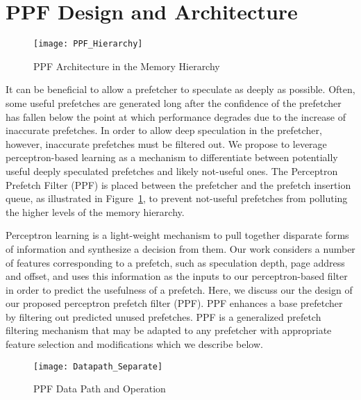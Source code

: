 \section{PPF Design and Architecture}
\label{Arch}

\begin{figure}
  \begin{center}
  \texttt{[image: PPF\_Hierarchy]}
  \caption{PPF Architecture in the Memory Hierarchy}
  \label{fig:PPF_Hierarchy}
  \end{center}
\end{figure}

It can be beneficial to allow a prefetcher to speculate as deeply as
possible. Often, some useful prefetches are generated long after the
confidence of the prefetcher has fallen below the point at which
performance degrades due to the increase of inaccurate prefetches.  In
order to allow deep speculation in the prefetcher, however, inaccurate
prefetches must be filtered out.  We propose to leverage
perceptron-based learning as a mechanism to differentiate between
potentially useful deeply speculated prefetches and likely not-useful
ones. The Perceptron Prefetch Filter (PPF) is placed between the
prefetcher and the prefetch insertion queue, as illustrated in
Figure~\ref{fig:PPF_Hierarchy}, to prevent not-useful prefetches from
polluting the higher levels of the memory hierarchy.

Perceptron learning is a light-weight mechanism to pull together
disparate forms of information and synthesize a decision from
them. Our work considers a number of features corresponding to a
prefetch, such as speculation depth, page address and offset, and uses
this information as the inputs to our perceptron-based filter in order
to predict the usefulness of a prefetch.  Here, we discuss our the
design of our proposed perceptron prefetch filter (PPF).  PPF enhances
a base prefetcher by filtering out predicted unused prefetches. PPF is
a generalized prefetch filtering mechanism that may be adapted to any
prefetcher with appropriate feature selection and modifications which
we describe below.

\begin{figure}[ht]
  \begin{center}
  \texttt{[image: Datapath\_Separate]}
  \caption{PPF Data Path and Operation}
  \label{fig:PPF_Datapath}
  \end{center}
\end{figure}

